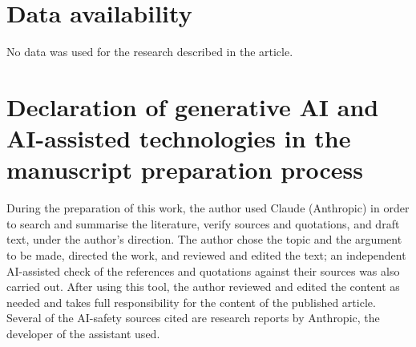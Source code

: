 \documentclass[review,12pt]{elsarticle}
\begin{document}
\section*{Data availability}
No data was used for the research described in the article.

\section*{Declaration of generative AI and AI-assisted technologies in the manuscript preparation process}
During the preparation of this work, the author used Claude (Anthropic) in order to search and summarise the literature, verify sources and quotations, and draft text, under the author's direction. The author chose the topic and the argument to be made, directed the work, and reviewed and edited the text; an independent AI-assisted check of the references and quotations against their sources was also carried out. After using this tool, the author reviewed and edited the content as needed and takes full responsibility for the content of the published article. Several of the AI-safety sources cited are research reports by Anthropic, the developer of the assistant used.



\end{document}
